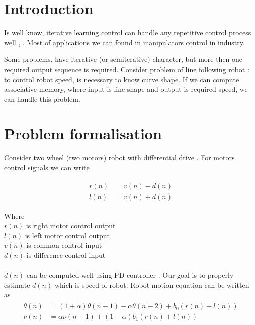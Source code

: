 \documentclass[twoside]{oss-conf-eng}
\begin{document}

\section*{Introduction}

Is well know, iterative learning control can handle any repetitive control
process well \cite{ilc1}, \cite{ilc2}. Most of applications we can found in manipulators
control in industry.

Some problems, have iterative (or semiterative) character, but more then one required
output sequence is required. Consider problem of line following robot : to control robot
speed, is necessary to know curve shape. If we can compute associative memory, where input is
line shape and output is required speed, we can handle this problem.

\section{Problem formalisation}

Consider two wheel (two motors) robot with differential drive \cite{robot_model_1}. For motors
control signals we can write

\begin{eqnarray}
\begin{split}
\label{robot_equation}
	r(n) &=	v(n) - d(n) \\
    l(n) &=	v(n) + d(n)
\end{split}
\end{eqnarray}

Where \\
$r(n)$ is right motor control output \\
$l(n)$ is left motor control output \\
$v(n)$ is common control input \\
$d(n)$ is difference control input \\
\\
$d(n)$ can be computed well using PD controller \cite{servo_pd}. Our goal
is to properly estimate $d(n)$ which is speed of robot.
Robot motion equation can be written as
\begin{eqnarray}
\begin{split}
\label{robot_equation}
	\theta(n) &= (1 + \alpha) \theta(n-1) - \alpha \theta(n-2) + b_0 (r(n) - l(n))  \\
    \nu(n) &=  \alpha \nu(n-1) + (1 - \alpha) b_1 (r(n) + l(n))
\end{split}
\end{eqnarray}
\end{document}
